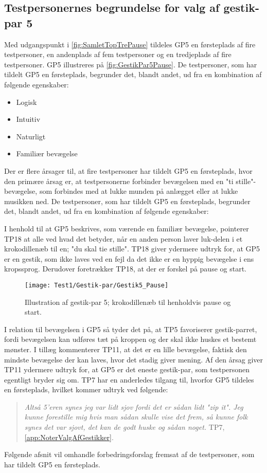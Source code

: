 \subsection{Testpersonernes begrundelse for valg af gestik-par 5}
\label{TestresultaterValgAfGestikkerBegrundelseGP5Pause}
%
Med udgangspunkt i \autoref{fig:SamletTopTrePause} tildeles GP5 en førsteplads af fire testpersoner, en andenplads af fem testpersoner og en tredjeplads af fire testpersoner. GP5 illustreres på \autoref{fig:GestikPar5Pause}. De testpersoner, som har tildelt GP5 en førsteplads, begrunder det, blandt andet, ud fra en kombination af følgende egenskaber: 
%
\begin{multicols}{3}
    \begin{itemize}
        \item Logisk
        \item Intuitiv
        \item Naturligt
        \item Familiær bevægelse
\end{itemize}
\end{multicols}
\noindent
%
Der er flere årsager til, at fire testpersoner har tildelt GP5 en førsteplads, hvor den primære årsag er, at testpersonerne forbinder bevægelsen med en "ti stille"-bevægelse, som forbindes med at lukke munden på anlægget eller at lukke musikken ned. De testpersoner, som har tildelt GP5 en førsteplads, begrunder det, blandt andet, ud fra en kombination af følgende egenskaber: 

I henhold til at GP5 beskrives, som værende en familiær bevægelse, pointerer TP18 at alle ved hvad det betyder, når en anden person laver luk-delen i et krokodillenæb til en; "du skal tie stille". TP18 giver ydermere udtryk for, at GP5 er en gestik, som ikke laves ved en fejl da det ikke er en hyppig bevægelse i ens kropssprog. Derudover foretrækker TP18, at der er forskel på pause og start. 
%
\begin{figure}[H]
	\centering
	\texttt{[image: Test1/Gestik-par/Gestik5\_Pause]}
	\caption{Illustration af gestik-par 5; krokodillenæb til henholdvis pause og start.}
	\label{fig:GestikPar5Pause}
\end{figure}
\noindent
%
I relation til bevægelsen i GP5 så tyder det på, at TP5 favoriserer gestik-parret, fordi bevægelsen kan udføres tæt på kroppen og der skal ikke huskes et bestemt mønster. I tillæg kommenterer TP11, at det er en lille bevægelse, faktisk den mindste bevægelse der kan laves, hvor det stadig giver mening. Af den årsag giver TP11 ydermere udtryk for, at GP5 er det eneste gestik-par, som testpersonen egentligt bryder sig om. TP7 har en anderledes tilgang til, hvorfor GP5 tildeles en førsteplads, hvilket kommer udtryk ved følgende: 
%
\begin{quotation}
	\noindent
	\textit{Altså 5'eren synes jeg var lidt sjov fordi det er sådan lidt "zip it". Jeg kunne forestille mig hvis man sådan skulle vise det frem, så kunne folk synes det var sjovt, det kan de godt huske og sådan noget.} TP7, \autoref{app:NoterValgAfGestikker}.
\noindent
\end{quotation}
%
Følgende afsnit vil omhandle forbedringsforslag fremsat af de testpersoner, som har tildelt GP5 en førsteplads.
%
